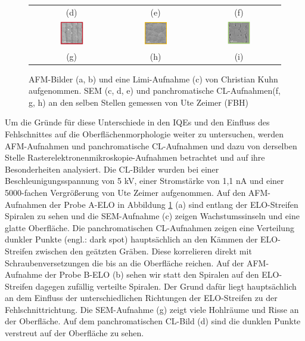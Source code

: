 \begin{figure}[H]
\begin{tabular}{ccc}
(d)  & (e) & (f)   \\[6pt]
\includegraphics[width=0.30\textwidth]{Bilder/TS4045/aELOcl1.png} & \includegraphics[width=0.30\textwidth]{Bilder/TS4045/bELOcl1.png}  & \includegraphics[width=0.30\textwidth]{Bilder/TS4045/cELOcl1.png} \\
(g)  & (h) & (i)   \\[6pt]
\end{tabular}
\caption{AFM-Bilder (a, b) und eine Limi-Aufnahme (c) von Christian Kuhn aufgenommen. SEM (c, d, e) und panchromatische CL-Aufnahmen(f, g, h) an den selben Stellen gemessen von Ute Zeimer (FBH)}
\label{fig:morph1}
\end{figure}
\noindent 
Um die Gründe für diese Unterschiede in den IQEs und den Einfluss des Fehlschnittes auf die Oberflächenmorphologie weiter zu untersuchen, werden AFM-Aufnahmen und panchromatische CL-Aufnahmen und dazu von derselben Stelle Rasterelektronenmikroskopie-Aufnahmen betrachtet und auf ihre Besonderheiten analysiert. Die CL-Bilder wurden bei einer Beschleunigungsspannung von 5 kV,
einer Stromstärke von 1,1 nA und einer 5000-fachen Vergrößerung von Ute Zeimer aufgenommen.
Auf den AFM-Aufnahmen der Probe A-ELO in Abbildung \ref{fig:morph1} (a) sind entlang der ELO-Streifen Spiralen zu sehen und die SEM-Aufnahme (c) zeigen Wachstumssinseln und eine glatte Oberfläche. Die panchromatischen CL-Aufnahmen zeigen eine Verteilung dunkler Punkte (engl.: dark spot) hauptsächlich an den Kämmen der ELO-Streifen zwischen den geätzten Gräben. Diese korrelieren direkt mit Schraubenversetzungen die bis an die Oberfläche reichen. Auf der AFM-Aufnahme der Probe B-ELO (b) sehen wir statt den Spiralen auf den ELO-Streifen dagegen zufällig verteilte Spiralen. Der Grund dafür liegt hauptsächlich an dem Einfluss der unterschiedlichen Richtungen der ELO-Streifen zu der Fehlschnittrichtung. Die SEM-Aufnahme (g) zeigt viele Hohlräume und Risse an der Oberfläche. Auf dem panchromatischen CL-Bild (d) sind die dunklen Punkte verstreut auf der Oberfläche zu sehen. 
